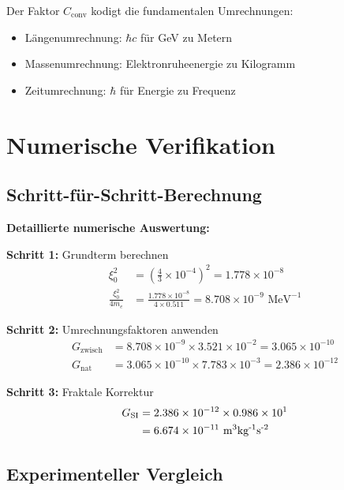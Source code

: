 	Der Faktor $C_{\text{conv}}$ kodigt die fundamentalen Umrechnungen:
	\begin{itemize}
		\item Längenumrechnung: $\hbar c$ für GeV zu Metern
		\item Massenumrechnung: Elektronruheenergie zu Kilogramm
		\item Zeitumrechnung: $\hbar$ für Energie zu Frequenz
	\end{itemize}
	
	\section{Numerische Verifikation}
	
	\subsection{Schritt-für-Schritt-Berechnung}
	
	\begin{verification}
		\textbf{Detaillierte numerische Auswertung:}
		
		\textbf{Schritt 1:} Grundterm berechnen
		\begin{align}
			\xi_0^2 &= \left(\frac{4}{3} \times 10^{-4}\right)^2 = 1.778 \times 10^{-8} \\
			\frac{\xi_0^2}{4 m_e} &= \frac{1.778 \times 10^{-8}}{4 \times 0.511} = 8.708 \times 10^{-9} \text{ MeV}^{-1}
		\end{align}
		
		\textbf{Schritt 2:} Umrechnungsfaktoren anwenden
		\begin{align}
			G_{\text{zwisch}} &= 8.708 \times 10^{-9} \times 3.521 \times 10^{-2} = 3.065 \times 10^{-10} \\
			G_{\text{nat}} &= 3.065 \times 10^{-10} \times 7.783 \times 10^{-3} = 2.386 \times 10^{-12}
		\end{align}
		
		\textbf{Schritt 3:} Fraktale Korrektur
		\begin{align}
			G_{\text{SI}} &= 2.386 \times 10^{-12} \times 0.986 \times 10^{1} \\
			&= 6.674 \times 10^{-11} \text{ m\textsuperscript{3}kg\textsuperscript{-1}s\textsuperscript{-2}}
		\end{align}
	\end{verification}
	
	\subsection{Experimenteller Vergleich}
	

